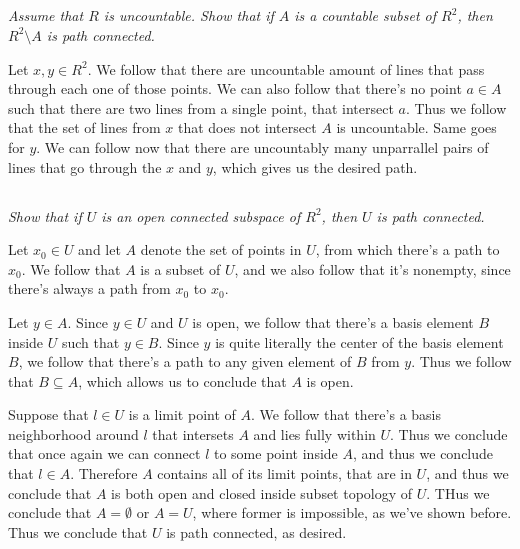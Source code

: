\documentclass[11pt,oneside,titlepage]{book}
\begin{document}
\subsection{}

\textit{Assume that $R$ is uncountable. Show that if $A$ is a countable subset of $R^2$,
  then $R^2 \setminus A$ is path connected.}

Let $x, y \in R^2$. 
We follow that there are uncountable amount of lines that pass through each one of those points.
We can also follow that there's no point $a \in A$ such that there are two lines from
a single point, that intersect $a$. Thus we follow that
the set of lines from $x$ that does not intersect $A$ is uncountable. Same goes for $y$.
We can follow now that there are uncountably many unparrallel pairs of lines that go through
the $x$ and $y$, which gives us the desired path.

\subsection{}

\textit{Show that if $U$ is an open connected subspace of $R^2$, then $U$ is path connected.}

Let $x_0 \in U$ and let $A$ denote the set of points in $U$, from which there's a path to $x_0$.
We follow that $A$ is a subset of $U$, and we also follow that it's nonempty, since
there's always a path from $x_0$ to $x_0$.

Let $y \in A$. Since $y \in U$ and $U$ is open, we follow that there's a
basis element $B$ inside $U$
such that $y \in B$. Since $y$ is quite literally the center of the basis element $B$,
we follow that there's a path to any given element of $B$ from $y$. Thus we follow that
$B \subseteq A$, which allows us to conclude that $A$ is open.

Suppose that $l \in U$ is a limit point of $A$. We follow that there's a basis neighborhood
around $l$ that intersets $A$ and lies fully within $U$. Thus we conclude that
once again we can connect $l$ to some point inside $A$, and thus we conclude that $l \in A$.
Therefore $A$ contains all of its limit points, that are in $U$, and thus we conclude that
$A$ is both open and closed inside subset topology of $U$. THus we conclude that
$A = \emptyset$ or $A = U$, where former is impossible, as we've shown before. Thus we
conclude that $U$ is path connected, as desired.

\subsection{}
\end{document}

